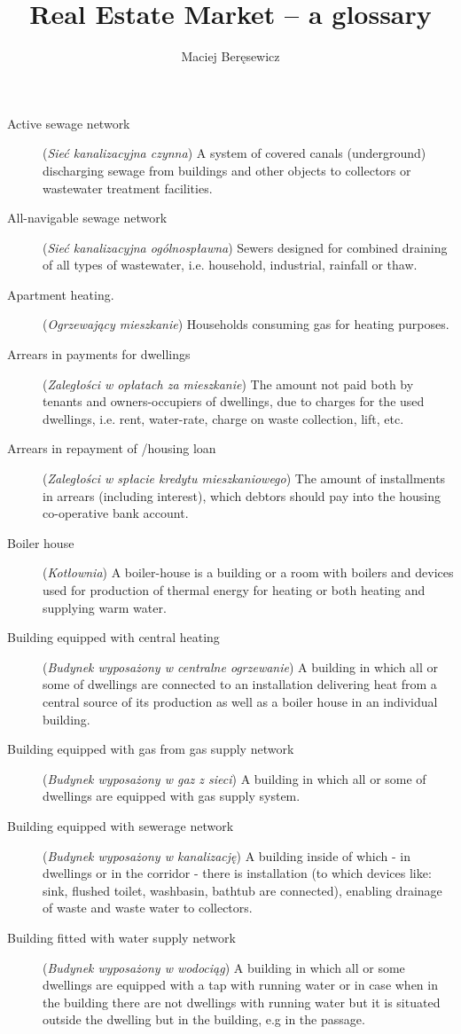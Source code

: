 \documentclass[12pt,a4paper]{article}
\author{Maciej Beręsewicz}
\title{Real Estate Market -- a glossary}
\begin{document}
\maketitle
\begin{description}
\item[Active sewage network] (\textit{Sieć kanalizacyjna czynna}) A system of covered canals (underground) discharging sewage from buildings and other objects to collectors or wastewater treatment facilities.
\item[All-navigable sewage network] (\textit{Sieć kanalizacyjna ogólnospławna}) Sewers designed for combined draining of all types of wastewater, i.e. household, industrial, rainfall or thaw.
\item[Apartment heating.] (\textit{Ogrzewający mieszkanie}) Households consuming gas for heating purposes.
\item[Arrears in payments for dwellings] (\textit{Zaległości w opłatach za mieszkanie}) The amount not paid both by tenants and owners-occupiers of dwellings, due to charges for the used dwellings, i.e. rent, water-rate, charge on waste collection, lift, etc.
\item[Arrears in repayment of /housing loan] (\textit{Zaległości w spłacie kredytu mieszkaniowego}) The amount of installments in arrears (including interest), which debtors should pay into the housing co-operative bank account.
\item[Boiler house] (\textit{Kotłownia}) A boiler-house is a building or a room with boilers and devices used for production of thermal energy for heating or both heating and supplying warm water.
\item[Building equipped with central heating] (\textit{Budynek wyposażony w centralne ogrzewanie}) A building in which all or some of dwellings are connected to an installation delivering heat from a central source of its production as well as a boiler house in an individual building.
\item[Building equipped with gas from gas supply network] (\textit{Budynek wyposażony w gaz z sieci}) A building in which all or some of dwellings are equipped with gas supply system.
\item[Building equipped with sewerage network] (\textit{Budynek wyposażony w kanalizację}) A building inside of which - in dwellings or in the corridor - there is installation (to which devices like: sink, flushed toilet, washbasin, bathtub are connected), enabling drainage of waste and waste water to collectors.
\item[Building fitted with water supply network] (\textit{Budynek wyposażony w wodociąg}) A building in which all or some dwellings are equipped with a tap with running water or in case when in the building there are not dwellings with running water but it is situated outside the dwelling but in the building, e.g in the passage.

\end{description}
\end{document}
